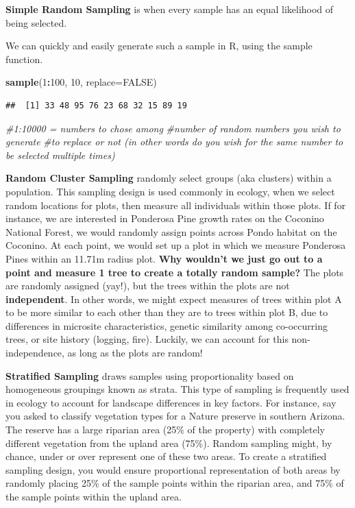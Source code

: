 \documentclass[
]{book}
\newenvironment{Shaded}{\begin{snugshade}}{\end{snugshade}}
\newcommand{\AttributeTok}[1]{\textcolor[rgb]{0.13,0.29,0.53}{#1}}
\newcommand{\CommentTok}[1]{\textcolor[rgb]{0.56,0.35,0.01}{\textit{#1}}}
\newcommand{\ConstantTok}[1]{\textcolor[rgb]{0.56,0.35,0.01}{#1}}
\newcommand{\DecValTok}[1]{\textcolor[rgb]{0.00,0.00,0.81}{#1}}
\newcommand{\FunctionTok}[1]{\textcolor[rgb]{0.13,0.29,0.53}{\textbf{#1}}}
\newcommand{\NormalTok}[1]{#1}
\newcommand{\SpecialCharTok}[1]{\textcolor[rgb]{0.81,0.36,0.00}{\textbf{#1}}}
\begin{document}
\textbf{Simple Random Sampling} is when every sample has an equal likelihood of being selected.

We can quickly and easily generate such a sample in R, using the sample function.

\begin{Shaded}
\begin{Highlighting}[]
\FunctionTok{sample}\NormalTok{(}\DecValTok{1}\SpecialCharTok{:}\DecValTok{100}\NormalTok{, }\DecValTok{10}\NormalTok{, }\AttributeTok{replace=}\ConstantTok{FALSE}\NormalTok{)}
\end{Highlighting}
\end{Shaded}

\begin{verbatim}
##  [1] 33 48 95 76 23 68 32 15 89 19
\end{verbatim}

\begin{Shaded}
\begin{Highlighting}[]
\CommentTok{\#1:10000 = numbers to chose among }
\CommentTok{\#number of random numbers you wish to generate}
\CommentTok{\#to replace or not (in other words do you wish for the same number to be selected multiple times)}
\end{Highlighting}
\end{Shaded}

\textbf{Random Cluster Sampling} randomly select groups (aka clusters) within a population. This sampling design is used commonly in ecology, when we select random locations for plots, then measure all individuals within those plots. If for instance, we are interested in Ponderosa Pine growth rates on the Coconino National Forest, we would randomly assign points across Pondo habitat on the Coconino. At each point, we would set up a plot in which we measure Ponderosa Pines within an 11.71m radius plot. \textbf{Why wouldn't we just go out to a point and measure 1 tree to create a totally random sample?} The plots are randomly assigned (yay!), but the trees within the plots are not \textbf{independent}. In other words, we might expect measures of trees within plot A to be more similar to each other than they are to trees within plot B, due to differences in microsite characteristics, genetic similarity among co-occurring trees, or site history (logging, fire). Luckily, we can account for this non-independence, as long as the plots are random!

\textbf{Stratified Sampling} draws samples using proportionality based on homogeneous groupings known as strata. This type of sampling is frequently used in ecology to account for landscape differences in key factors. For instance, say you asked to classify vegetation types for a Nature preserve in southern Arizona. The reserve has a large riparian area (25\% of the property) with completely different vegetation from the upland area (75\%). Random sampling might, by chance, under or over represent one of these two areas. To create a stratified sampling design, you would ensure proportional representation of both areas by randomly placing 25\% of the sample points within the riparian area, and 75\% of the sample points within the upland area.
\end{document}
